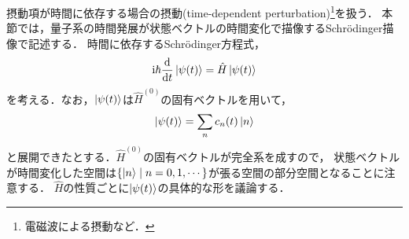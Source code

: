 \documentclass{report}
\begin{document}
  摂動項が時間に依存する場合の摂動(time-dependent perturbation)\footnote{電磁波による摂動など．}を扱う．
  本節では，量子系の時間発展が状態ベクトルの時間変化で描像するSchr\"odinger描像で記述する．
  時間に依存するSchrödinger方程式，
  \begin{align}
    \mathrm{i}\hbar\dv{t}\ket{\psi(t)} = \hat{H}\ket{\psi(t)}\label{time-dependent-schroinger-eq}
  \end{align}
  を考える．なお，$\ket{\psi(t)}$は$\hat{H}^{(0)}$の固有ベクトルを用いて，
  \begin{align}
    \ket{\psi(t)} = \sum_{n}c_n(t)\ket{n}\label{psi-t-expantion}
  \end{align}
  と展開できたとする．$\hat{H}^{(0)}$の固有ベクトルが完全系を成すので，
  状態ベクトルが時間変化した空間は$\qty{\ket{n}\mid n = 0, 1, \cdots}$が張る空間の部分空間となることに注意する．
  $\hat{H}$の性質ごとに$\ket{\psi(t)}$の具体的な形を議論する．
\end{document}
